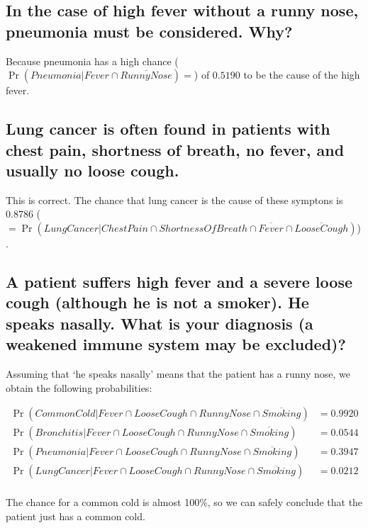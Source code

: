 \documentclass[12pt, a4paper]{article}
\begin{document}
\subsection{In the case of high fever without a runny nose, pneumonia must be considered. Why?}
Because pneumonia has a high chance ($\Pr(Pneumonia | Fever \cap \overline{RunnyNose}) =$) of $0.5190$ to be the cause of the high fever.

\subsection{Lung cancer is often found in patients with chest pain, shortness of breath, no fever, and usually no loose cough.}
This is correct. The chance that lung cancer is the cause of these symptons is $0.8786$ ($= \Pr(LungCancer | ChestPain \cap ShortnessOfBreath \cap \overline{Fever} \cap \overline{LooseCough})$) .

\subsection{A patient suffers high fever and a severe loose cough (although he is not a smoker). He speaks nasally. What is your diagnosis (a weakened immune system may be excluded)?}
Assuming that `he speaks nasally' means that the patient has a runny nose, we obtain the following probabilities:

\begin{align*}
\Pr(CommonCold | Fever \cap LooseCough \cap RunnyNose \cap \overline{Smoking}) &= 0.9920 \\
\Pr(Bronchitis | Fever \cap LooseCough \cap RunnyNose \cap \overline{Smoking}) &= 0.0544 \\
\Pr(Pneumonia | Fever \cap LooseCough \cap RunnyNose \cap \overline{Smoking}) &= 0.3947 \\
\Pr(LungCancer | Fever \cap LooseCough \cap RunnyNose \cap \overline{Smoking}) &= 0.0212 \\
\end{align*}

The chance for a common cold is almost 100\%, so we can safely conclude that the patient just has a common cold.
\end{document}
